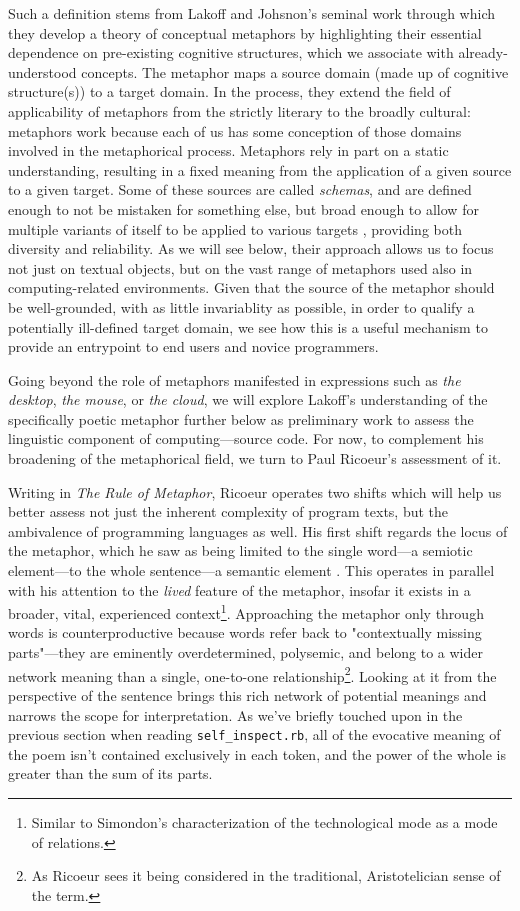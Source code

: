 Such a definition stems from Lakoff and Johsnon's seminal work through which they develop a theory of conceptual metaphors by highlighting their essential dependence on pre-existing cognitive structures, which we associate with already-understood concepts. The metaphor maps a source domain (made up of cognitive structure(s)) to a target domain. In the process, they extend the field of applicability of metaphors from the strictly literary to the broadly cultural: metaphors work because each of us has some conception of those domains involved in the metaphorical process. Metaphors rely in part on a static understanding, resulting in a fixed meaning from the application of a given source to a given target. Some of these sources are called \emph{schemas}, and are defined enough to not be mistaken for something else, but broad enough to allow for multiple variants of itself to be applied to various targets \citep{lakoff_metaphors_1980}, providing both diversity and reliability. As we will see below, their approach allows us to focus not just on textual objects, but on the vast range of metaphors used also in computing-related environments. Given that the source of the metaphor should be well-grounded, with as little invariablity as possible, in order to qualify a potentially ill-defined target domain, we see how this is a useful mechanism to provide an entrypoint to end users and novice programmers.

Going beyond the role of metaphors manifested in expressions such as \emph{the desktop}, \emph{the mouse}, or \emph{the cloud}, we will explore Lakoff's understanding of the specifically poetic metaphor further below as preliminary work to assess the linguistic component of computing—source code. For now, to complement his broadening of the metaphorical field, we turn to Paul Ricoeur's assessment of it.

Writing in \emph{The Rule of Metaphor}, Ricoeur operates two shifts which will help us better assess not just the inherent complexity of program texts, but the ambivalence of programming languages as well. His first shift regards the locus of the metaphor, which he saw as being limited to the single word—a semiotic element—to the whole sentence—a semantic element \citep{ricoeur_rule_2003}. This operates in parallel with his attention to the \emph{lived} feature of the metaphor, insofar it exists in a broader, vital, experienced context\footnote{Similar to Simondon's characterization of the technological mode as a mode of relations.}. Approaching the metaphor only through words is counterproductive because words refer back to "contextually missing parts"—they are eminently overdetermined, polysemic, and belong to a wider network meaning than a single, one-to-one relationship\footnote{As Ricoeur sees it being considered in the traditional, Aristotelician sense of the term.}. Looking at it from the perspective of the sentence brings this rich network of potential meanings and narrows the scope for interpretation. As we've briefly touched upon in the previous section when reading \lstinline{self_inspect.rb}, all of the evocative meaning of the poem isn't contained exclusively in each token, and the power of the whole is greater than the sum of its parts. %

